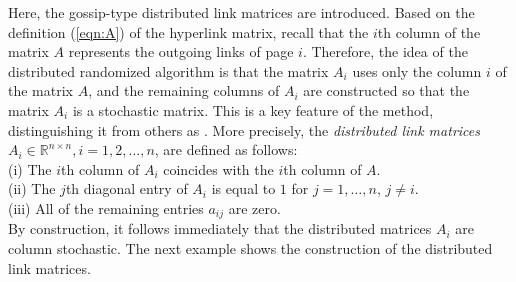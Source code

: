 \documentclass[11pt,draftcls,onecolumn]{IEEEtran}
\newcommand{\field}[1]{{\mathbb{#1}}}
\newcommand{\R}{\field{R}}
\begin{document}
Here, the gossip-type distributed link matrices are introduced.
Based on the definition (\ref{eqn:A}) of 
the hyperlink matrix, recall that the $i$th column of the matrix $A$ represents the outgoing links 
of page $i$. Therefore, the idea of the distributed randomized algorithm is that the matrix $A_i$ 
uses only the column $i$ of the matrix $A$, and the remaining columns of $A_i$ are constructed 
so that the matrix $A_i$ is a stochastic matrix. 
This is a key feature of the method, distinguishing it from others as \cite{Nesterov:12,Necoara:13}. 
More precisely, the {\it distributed link matrices}
$A_i\in\R^{n\times n}, i=1,2, \ldots,n$, are defined as follows: \\
(i) The $i$th column of $A_i$ coincides with the $i$th column of $A$. \\
(ii) The $j$th diagonal entry of $A_i$ is equal to $1$ for 
$j=1,\ldots,n$, $j\neq i$. \\
(iii) All of the remaining entries $a_{ij}$ are zero.\\
By construction, it follows immediately that the distributed matrices $A_i$ are column stochastic. 
The next example shows the construction of the distributed link matrices.
\end{document}
